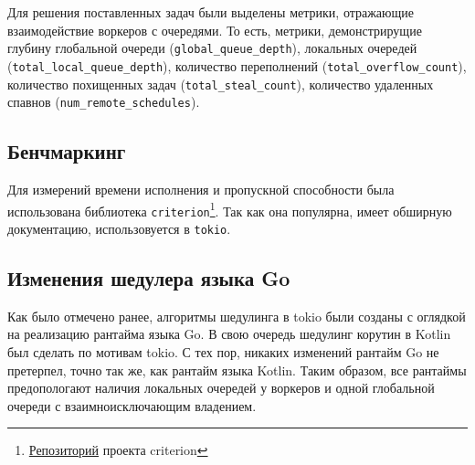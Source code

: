 Для решения поставленных задач были выделены метрики, отражающие взаимодействие воркеров с очередями. То есть, метрики, демонстрирущие глубину глобальной очереди (\verb|global_queue_depth|), локальных очередей (\verb|total_local_queue_depth|), количество переполнений (\verb|total_overflow_count|), количество похищенных задач (\verb|total_steal_count|), количество удаленных спавнов (\verb|num_remote_schedules|).

\subsection{Бенчмаркинг}

Для измерений времени исполнения и пропускной способности была использована библиотека \verb|criterion|\footnote{\href{https://github.com/bheisler/criterion.rs}{Репозиторий} проекта criterion}. Так как она популярна, имеет обширную документацию, использовуется в \verb|tokio|.

\subsection{Изменения шедулера языка Go}

Как было отмечено ранее, алгоритмы шедулинга в tokio были созданы с оглядкой на реализацию рантайма языка Go. В свою очередь шедулинг корутин в Kotlin был сделать по мотивам tokio. С тех пор, никаких изменений рантайм Go не претерпел, точно так же, как рантайм языка Kotlin. Таким образом, все рантаймы предопологают наличия локальных очередей у воркеров и одной глобальной очереди с взаимноисключающим владением.
